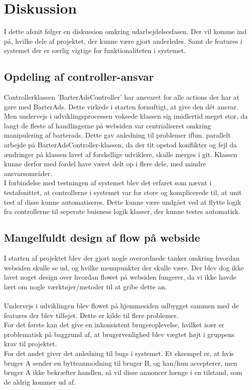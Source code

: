 \chapter{Diskussion}
I dette afsnit følger en diskussion omkring udarbejdelsesfasen. Der vil komme ind på, hvilke dele af projektet, der kunne være gjort anderledes. Samt de features i systemet der er særlig vigtige for funktionaliteten i systemet.

\section{Opdeling af controller-ansvar}
Controllerklassen 'BarterAdsController' har ansvaret for alle actions der har at gøre med BarterAds. Dette virkede i starten fornuftigt, at give den dét ansvar. Men undervejs i udviklingsprocessen voksede klassen sig imidlertid meget stor, da langt de fleste af handlingerne på websiden var centrialiseret omkring manipulering af barterads. Dette gav anledning til problemer ifbm. parallelt arbejde på BarterAdsController-klassen, da der tit opstod konflikter og fejl da ændringer på klassen lavet af forskellige udviklere, skulle merges i git. Klassen kunne derfor med fordel have været delt op i flere dele, med mindre ansvarsområder. \\
I forbindelse med testningen af systemet blev det erfaret som nævnt i testafsnittet, at controllerne i systemet var for store og komplicerede til, at unit test af disse kunne automatiseres. Dette kunne være undgået ved at flytte logik fra controllerne til seperate buisness logik klasser, der kunne testes automatisk.

\section{Mangelfuldt design af flow på webside}
I starten af projektet blev der gjort nogle overordnede tanker omkring hvordan websiden skulle se ud, og hvilke menupunkter der skulle være. Der blev dog ikke lavet noget design over hvordan flowet på websiden fungerer, da vi ikke havde lært om nogle værktøjer/metoder til at gribe dette an. \\ \\
Undervejs i udviklingen blev flowet på hjemmesiden udbygget sammen med de features der blev tilføjet. Dette er kilde til flere problemer. \\
For det første kan det give en inkonsistent brugeroplevelse, hvilket især er problematisk på baggrund af, at brugervenlighed blev vægtet højt i gruppens krav til projektet. \\
For det andet giver det anledning til bugs i systemet. Et eksempel er, at hvis bruger A sender en bytteanmodning til bruger B, og han/hun accepterer, men bruger A ikke bekræfter handlen, så vil disse annoncer hænge i en tilstand, som de aldrig kommer ud af.\\


